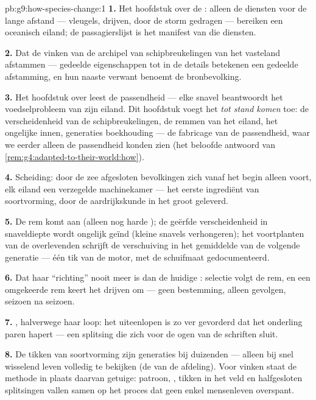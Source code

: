\begin{solution}{pb:g9:how-species-change:1}
\textbf{1.} Het hoofdstuk over de : alleen de diensten
voor de lange afstand --- vleugels, drijven, door de storm gedragen
--- bereiken een oceanisch eiland; de passagierslijst is het
manifest van die diensten.

\textbf{2.} Dat de vinken van de archipel van schipbreukelingen van
het vasteland afstammen --- gedeelde eigenschappen tot in de details
betekenen een gedeelde afstamming, en hun naaste verwant benoemt de
bronbevolking.

\textbf{3.} Het hoofdstuk over  leest de passendheid ---
elke snavel beantwoordt het voedselprobleem van zijn eiland. Dit
hoofdstuk voegt het \emph{tot stand komen} toe: de verscheidenheid
van de schipbreukelingen, de remmen van het eiland, het ongelijke
innen, generaties boekhouding --- de fabricage van de passendheid,
waar we eerder alleen de passendheid konden zien (het beloofde
antwoord van \cref{rem:g4:adapted-to-their-world:how}).

\textbf{4.} Scheiding: door de zee afgesloten bevolkingen 
zich vanaf het begin alleen voort, elk eiland een verzegelde
machinekamer --- het eerste ingrediënt van soortvorming, door de
aardrijkskunde in het groot geleverd.

\textbf{5.} De rem komt aan (alleen nog harde ); de geërfde
verscheidenheid in snaveldiepte wordt ongelijk geïnd (kleine
snavels verhongeren); het voortplanten van de overlevenden schrijft
de verschuiving in het gemiddelde van de volgende generatie ---
één tik van de motor, met de schuifmaat gedocumenteerd.

\textbf{6.} Dat haar ``richting'' nooit meer is dan de huidige
: selectie volgt de rem, en een omgekeerde rem keert
het drijven om --- geen bestemming, alleen gevolgen, seizoen na
seizoen.

\textbf{7.} , halverwege
haar loop: het uiteenlopen is zo ver gevorderd dat het onderling
paren hapert --- een splitsing die zich voor de ogen van de
schriften sluit.

\textbf{8.} De tikken van soortvorming zijn generaties bij
duizenden --- alleen bij snel wisselend leven volledig te bekijken
(de  van de afdeling). Voor vinken staat de methode in
plaats daarvan getuige: patroon, , tikken in het veld
en halfgesloten splitsingen vallen samen op het proces dat geen
enkel mensenleven overspant.


\end{solution}
